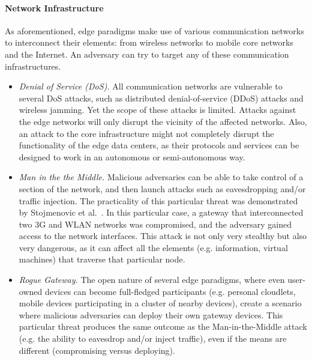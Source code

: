 \documentclass[twocolumn,preprint,3p]{elsarticle}
\begin{document}
\paragraph{Network Infrastructure} As aforementioned, edge paradigms make use of various communication networks to interconnect their elements: from wireless networks to mobile core networks and the Internet. An adversary can try to target any of these communication infrastructures.
    \begin{itemize}
      \item \textit{Denial of Service (DoS).} All communication networks are vulnerable to several DoS attacks, such as distributed denial-of-service (DDoS) attacks and wireless jamming. Yet the scope of these attacks is limited. Attacks against the edge networks will only disrupt the vicinity of the affected networks. Also, an attack to the core infrastructure might not completely disrupt the functionality of the edge data centers, as their protocols and services can be designed to work in an autonomous or semi-autonomous way.
      \item \textit{Man in the the Middle.} Malicious adversaries can be able to take control of a section of the network, and then launch attacks such as eavesdropping and/or traffic injection. The practicality of this particular threat was demonstrated by Stojmenovic et al.~\cite{StojmenovicFSec05}. In this particular case, a gateway that interconnected two 3G and WLAN networks was compromised, and the adversary gained access to the network interfaces. This attack is not only very stealthy but also very dangerous, as it can affect all the elements (e.g. information, virtual machines) that traverse that particular node.
      \item \textit{Rogue Gateway.} The open nature of several edge paradigms, where even user-owned devices can become full-fledged participants (e.g. personal cloudlets, mobile devices participating in a cluster of nearby devices), create a scenario where malicious adversaries can deploy their own gateway devices. This particular threat produces the same outcome as the Man-in-the-Middle attack (e.g. the ability to eavesdrop and/or inject traffic), even if the means are different (compromising versus deploying).
    \end{itemize}
\end{document}
